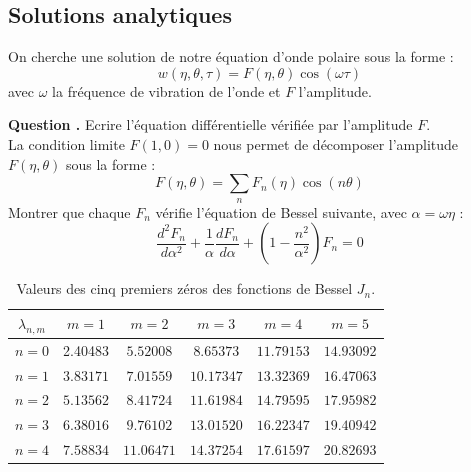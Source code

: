 \documentclass[a4,12pt]{article}
\newcounter{Nbquestion}
\newcommand*\question{%
\stepcounter{Nbquestion}%
\textbf{Question \theNbquestion. }}
\begin{document}

\subsection{Solutions analytiques }
On cherche une solution de notre équation d'onde polaire sous la forme :
\[
w(\eta,\theta,\tau)=F(\eta,\theta)\cos(\omega \tau)
\]
avec $\omega$ la fréquence de vibration de l'onde et $F$ l'amplitude.


\begin{mdframed}[style=exampledefault]
\question Ecrire l'équation différentielle vérifiée par l'amplitude $F$.\\

La condition limite $F(1,0)=0$ nous permet de décomposer l'amplitude $F(\eta,\theta)$ sous la forme :
\[
F(\eta,\theta)=\sum_n F_n(\eta)\cos(n\theta)
\]
Montrer que chaque $F_n$ vérifie l'équation de Bessel suivante, avec  $\alpha=\omega\eta$ :
\[
\frac{d^2 F_n}{d\alpha^2}+\frac{1}{\alpha}\frac{dF_n}{d\alpha}+\left(1-\frac{n^2}{\alpha^2}\right)F_n=0
\]
\end{mdframed}


\begin{table}
	\begin{center}
		\begin{tabular}{|c|c|c|c|c|c|}
			\hline
			$\lambda_{n,m}$&$m=1$  &$m=2$ & $m=3$ &$ m=4$&$m=5$\\
			\hline
			$n=0$&2.40483&$5.52008$&$8.65373$&$11.79153$&$14.93092$\\
			\hline
			$n=1$&$3.83171$&$7.01559$&$10.17347$&$13.32369$&$16.47063$\\
			\hline
			$n=2$&$5.13562$&$8.41724$&$11.61984$&$14.79595$&$17.95982$\\
			\hline
			$n=3$&$6.38016$&$9.76102$&$13.01520$&$16.22347$&$19.40942$\\
			\hline
			$n=4$&$7.58834$&$11.06471$&$14.37254$&$17.61597$&$20.82693$\\
			\hline
		\end{tabular}
		\caption{Valeurs des cinq premiers zéros des fonctions de Bessel $J_n$.}
 	\end{center}
\end{table}
\end{document}
